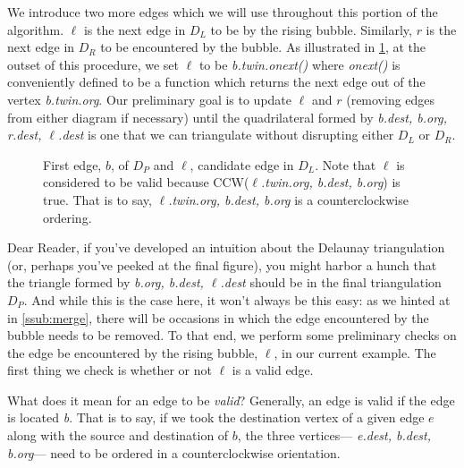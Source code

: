 \documentclass[12pt,twoside]{reedthesis}
\begin{document}
      We introduce two more edges which we will use throughout this portion of the algorithm. $\ell$ is the next edge in $D_{L}$ to be  by the rising bubble. Similarly, $r$ is the next edge in $D_{R}$ to be encountered by the bubble. As illustrated in \cref{fig:del_knit0}, at the outset of this procedure, we set $\ell$ to be \emph{b.twin.onext()} where \emph{onext()} is conveniently defined to be a function which returns the next edge out of the vertex \emph{b.twin.org}. Our preliminary goal is to update $\ell$ and $r$ (removing edges from either diagram if necessary) until the quadrilateral formed by \textit{b.dest, b.org, r.dest, $\ell$.dest} is one that we can triangulate without disrupting either $D_{L}$ or $D_{R}$.\par 

      \begin{figure}[!htb]
        \centering
        \begin{subtable}{\textwidth}
          \centering
          
          \caption{First edge, $b$, of $D_{P}$ and $\ell$, candidate edge in $D_{L}$. Note that $\ell$ is considered to be valid because \textsc{CCW}(\textit{$\ell$.twin.org, b.dest, b.org}) is true. That is to say, \textit{$\ell$.twin.org, b.dest, b.org} is a counterclockwise ordering.}
          \label{fig:del_knit0}
        \end{subtable}
      \end{figure}

      Dear Reader, if you've developed an intuition about the Delaunay triangulation (or, perhaps you've peeked at the final figure), you might harbor a hunch that the triangle formed by \textit{b.org, b.dest, $\ell$.dest} should be in the final triangulation $D_{P}$. And while this is the case here, it won't always be this easy: as we hinted at in \cref{ssub:merge}, there will be occasions in which the edge encountered by the bubble needs to be removed. To that end, we perform some preliminary checks on the edge be encountered by the rising bubble, $\ell$, in our current example. The first thing we check is whether or not $\ell$ is a valid edge. \par

      What does it mean for an edge to be \emph{valid}? Generally, an edge is valid if the edge is located  \emph{b}. That is to say, if we took the destination vertex of a given edge $e$ along with the source and destination of $b$, the three vertices--- \textit{e.dest, b.dest, b.org}--- need to be ordered in a counterclockwise orientation. \par
\end{document}
